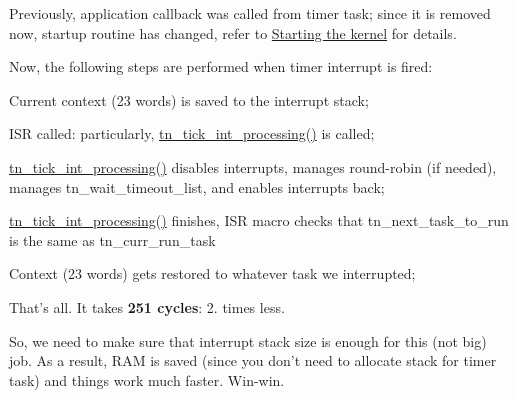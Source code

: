 Previously, application callback was called from timer task; since it is removed now, startup routine has changed, refer to \hyperlink{quick_guide_starting_the_kernel}{Starting the kernel} for details.

Now, the following steps are performed when timer interrupt is fired\+:


\begin{DoxyItemize}
\item Current context (23 words) is saved to the interrupt stack;
\item I\+S\+R called\+: particularly, {\ttfamily \hyperlink{tn__sys_8h_a944d96c7a5d442d271115b6cb22a085b}{tn\+\_\+tick\+\_\+int\+\_\+processing()}} is called;
\item {\ttfamily \hyperlink{tn__sys_8h_a944d96c7a5d442d271115b6cb22a085b}{tn\+\_\+tick\+\_\+int\+\_\+processing()}} disables interrupts, manages round-\/robin (if needed), manages {\ttfamily tn\+\_\+wait\+\_\+timeout\+\_\+list}, and enables interrupts back;
\item {\ttfamily \hyperlink{tn__sys_8h_a944d96c7a5d442d271115b6cb22a085b}{tn\+\_\+tick\+\_\+int\+\_\+processing()}} finishes, I\+S\+R macro checks that {\ttfamily tn\+\_\+next\+\_\+task\+\_\+to\+\_\+run} is the same as {\ttfamily tn\+\_\+curr\+\_\+run\+\_\+task}
\item Context (23 words) gets restored to whatever task we interrupted;
\end{DoxyItemize}

That's all. It takes {\bfseries 251 cycles}\+: 2. times less.

So, we need to make sure that interrupt stack size is enough for this (not big) job. As a result, R\+A\+M is saved (since you don't need to allocate stack for timer task) and things work much faster. Win-\/win. 